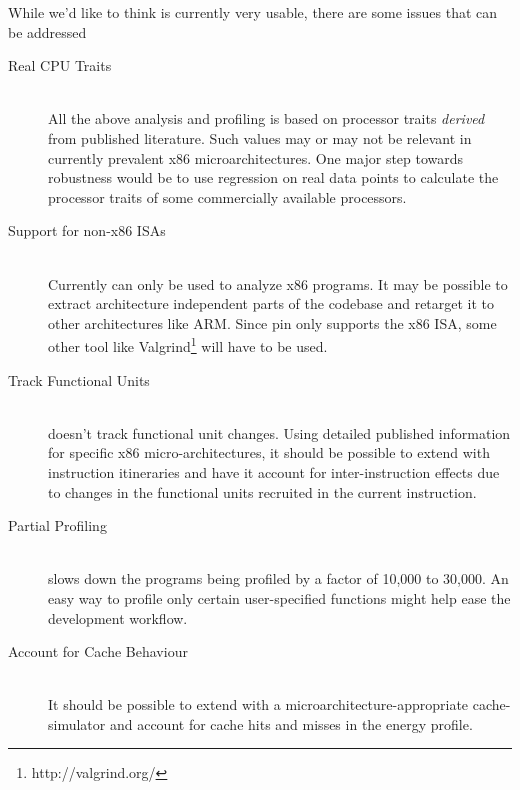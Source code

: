 While we'd like to think \wattage is currently very usable, there are
some issues that can be addressed

\begin{description}
\item[Real CPU Traits] \hfill \\ All the above analysis and profiling
  is based on processor traits \textit{derived} from published
  literature.  Such values may or may not be relevant in currently
  prevalent x86 microarchitectures.  One major step towards robustness
  would be to use regression on real data points to calculate the
  processor traits of some commercially available processors.

\item[Support for non-x86 ISAs] \hfill \\ Currently \wattage can only
  be used to analyze x86 programs.  It may be possible to extract
  architecture independent parts of the codebase and retarget it to
  other architectures like ARM.  Since pin only supports the x86 ISA,
  some other tool like Valgrind\footnote{http://valgrind.org/} will
  have to be used.

\item[Track Functional Units] \hfill \\ \wattage doesn't track
  functional unit changes.  Using detailed published information for
  specific x86 micro-architectures, it should be possible to extend
  \wattage with instruction itineraries and have it account for
  inter-instruction effects due to changes in the functional units
  recruited in the current instruction.

\item[Partial Profiling] \hfill \\ \wattage slows down the programs
  being profiled by a factor of 10,000 to 30,000.  An easy way to
  profile only certain user-specified functions might help ease the
  development workflow.

\item[Account for Cache Behaviour] \hfill \\ It should be possible to
  extend \wattage with a microarchitecture-appropriate cache-simulator
  and account for cache hits and misses in the energy profile.
\end{description}
